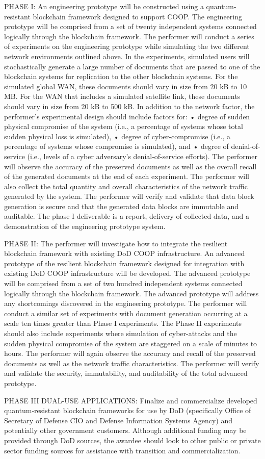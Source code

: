 PHASE I: An engineering prototype will be constructed using a quantum-resistant blockchain framework designed to support COOP. The engineering prototype will be comprised from a set of twenty independent systems connected logically through the blockchain framework. The performer will conduct a series of experiments on the engineering prototype while simulating the two different network environments outlined above. In the experiments, simulated users will stochastically generate a large number of documents that are passed to one of the blockchain systems for replication to the other blockchain systems. For the simulated global WAN, these documents should vary in size from 20 kB to 10 MB. For the WAN that includes a simulated satellite link, these documents should vary in size from 20 kB to 500 kB. In addition to the network factor, the performer’s experimental design should include factors for: • degree of sudden physical compromise of the system (i.e., a percentage of systems whose total sudden physical loss is simulated), • degree of cyber-compromise (i.e., a percentage of systems whose compromise is simulated), and • degree of denial-of-service (i.e., levels of a cyber adversary’s denial-of-service efforts). The performer will observe the accuracy of the preserved documents as well as the overall recall of the generated documents at the end of each experiment. The performer will also collect the total quantity and overall characteristics of the network traffic generated by the system. The performer will verify and validate that data block generation is secure and that the generated data blocks are immutable and auditable. The phase I deliverable is a report, delivery of collected data, and a demonstration of the engineering prototype system.

PHASE II: The performer will investigate how to integrate the resilient blockchain framework with existing DoD COOP infrastructure. An advanced prototype of the resilient blockchain framework designed for integration with existing DoD COOP infrastructure will be developed. The advanced prototype will be comprised from a set of two hundred independent systems connected logically through the blockchain framework. The advanced prototype will address any shortcomings discovered in the engineering prototype. The performer will conduct a similar set of experiments with document generation occurring at a scale ten times greater than Phase I experiments. The Phase II experiments should also include experiments where simulation of cyber-attacks and the sudden physical compromise of the system are staggered on a scale of minutes to hours. The performer will again observe the accuracy and recall of the preserved documents as well as the network traffic characteristics. The performer will verify and validate the security, immutability, and auditability of the total advanced prototype.

PHASE III DUAL-USE APPLICATIONS: Finalize and commercialize developed quantum-resistant blockchain frameworks for use by DoD (specifically Office of Secretary of Defense CIO and Defense Information Systems Agency) and potentially other government customers. Although additional funding may be provided through DoD sources, the awardee should look to other public or private sector funding sources for assistance with transition and commercialization.
